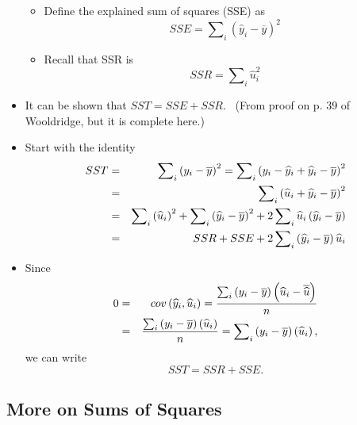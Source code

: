 \documentclass[11pt]{article}
\begin{document}
\begin{itemize}
\begin{itemize}
\item Define the explained sum of squares (SSE) as%
\begin{equation*}
SSE=\sum\nolimits_{i}\left( \widehat{y}_{i}-\overline{y}\right) ^{2}
\end{equation*}

\item Recall that SSR is%
\begin{equation*}
SSR=\sum\nolimits_{i}\widehat{u}_{i}^{2}
\end{equation*}
\end{itemize}

\item It can be shown that $SST=SSE+SSR.$ \ (From proof on p. 39 of
Wooldridge, but it is complete here.)

\item Start with the identity%
\begin{eqnarray*}
SST &=&\sum\nolimits_{i}\left( y_{i}-\overline{y}\right)
^{2}=\sum\nolimits_{i}\left( y_{i}-\widehat{y}_{i}+\widehat{y}_{i}-\overline{%
y}\right) ^{2} \\
&=&\sum\nolimits_{i}\left( \widehat{u}_{i}+\widehat{y}_{i}-\overline{y}%
\right) ^{2} \\
&=&\sum\nolimits_{i}\left( \widehat{u}_{i}\right)
^{2}+\sum\nolimits_{i}\left( \widehat{y}_{i}-\overline{y}\right)
^{2}+2\sum\nolimits_{i}\widehat{u}_{i}\left( \widehat{y}_{i}-\overline{y}%
\right) \\
&=&SSR+SSE+2\sum\nolimits_{i}\left( \widehat{y}_{i}-\overline{y}\right) 
\widehat{u}_{i}
\end{eqnarray*}

\item Since%
\begin{eqnarray*}
0 &=&cov\left( \widehat{y}_{i},\widehat{u}_{i}\right) =\frac{%
\sum\nolimits_{i}\left( y_{i}-\overline{y}\right) \left( \widehat{u}_{i}-%
\overline{\widehat{u}}\right) }{n} \\
&=&\frac{\sum\nolimits_{i}\left( y_{i}-\overline{y}\right) \left( \widehat{u}%
_{i}\right) }{n}=\sum\nolimits_{i}\left( y_{i}-\overline{y}\right) \left( 
\widehat{u}_{i}\right) ,
\end{eqnarray*}%
we can write%
\begin{equation*}
SST=SSR+SSE.
\end{equation*}
\end{itemize}

\subsection{More on Sums of Squares}
\end{document}
